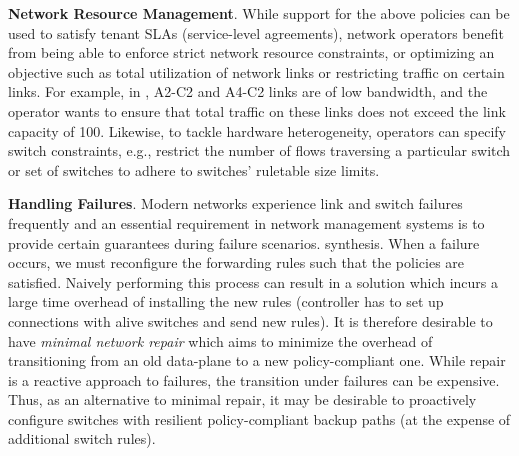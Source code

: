 \begin{compactitemize}
\item \textbf{Network Resource Management}. While support for the
  above policies can be used to satisfy tenant SLAs (service-level
  agreements), network operators benefit from being able to enforce
  strict network resource constraints, or optimizing an objective such
  as total utilization of network links or restricting traffic on
  certain links. For example, in , A2-C2 and A4-C2
  links are of low bandwidth, and the operator wants to ensure that
  total traffic on these links does not exceed the link capacity of 100.
  Likewise, to tackle hardware heterogeneity, operators can specify
  switch constraints, e.g., restrict the number of flows traversing a
  particular switch or set of switches to adhere to switches'
  ruletable size limits.
  
 
 \item \textbf{Handling Failures}. Modern networks experience link and switch failures
 frequently and an essential requirement in network management systems is to
 provide certain guarantees during failure scenarios. 
 synthesis.  When a failure occurs, we must reconfigure the forwarding
 rules such that the policies are satisfied. Naively performing this
 process can result in a solution which incurs a large time overhead
 of installing the new rules (controller has to set up connections
 with alive switches and send new rules). It is therefore desirable to
 have {\em minimal network repair} which aims to minimize the overhead of
 transitioning from an old data-plane to a new policy-compliant
 one. While repair is a reactive approach to failures, the transition
 under failures can be expensive. Thus, as an alternative to minimal
 repair, it may be desirable to proactively configure switches with
 resilient policy-compliant backup paths (at the expense of additional
 switch rules).
\end{compactitemize}



